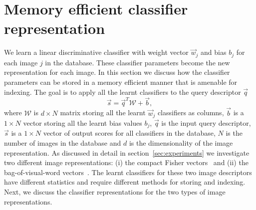 		 

  \section{Memory efficient classifier representation}  
  \label{sec:memory}
  
  We learn a linear discriminative classifier with weight vector $\vec{w}_j$ and bias $b_j$ for each image $j$ in the database.   
  These classifier parameters become the new representation for each image. 
  In this section we discuss how the classifier parameters can be stored in a memory efficient manner that is amenable for indexing. 
  The goal is to apply all the learnt classifiers to the query descriptor $\vec{q}$
      \begin{equation}
      \label{eq:allscores}
        \vec{s}=\vec{q}^T \mathcal{W}+\vec{b}, %
      \end{equation}
  where $\mathcal{W}$ is $d\times N$ matrix storing all the learnt $\vec{w}_j$ classifiers as columns, $\vec{b}$ is a $1\times N$ vector storing all the learnt bias values $b_j$, 
  $\vec{q}$ is the input query descriptor, $\vec{s}$ is a $1\times N$ vector of output scores for all classifiers in the database, $N$ is the number of images in the database  and $d$ is the dimensionality of the image representation. 
  As discussed in detail in section~\ref{sec:experiments} we investigate two different image representations:   (i) the compact Fisher vectors~\cite{Jegou12} and (ii) the bag-of-visual-word vectors~\cite{Sivic03}. The learnt classifiers for these two image descriptors have different statistics and require different methods for storing and indexing. Next, we discuss the classifier representations for the two types of image representations.
 
